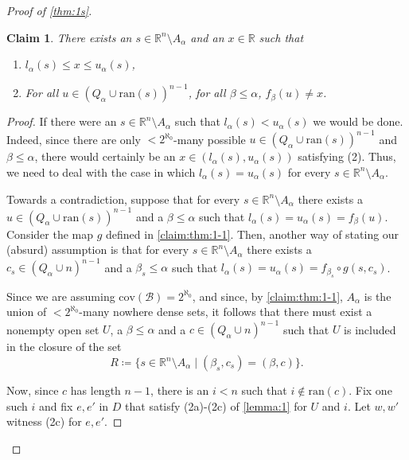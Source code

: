 \documentclass[12pt]{amsart}
\newtheorem{claim}{Claim}[theorem]
\theoremstyle{definition}
\theoremstyle{remark}
\begin{document}
\begin{proof}[Proof of \cref{thm:1s}]
\begin{claim}\label{claim:thm:1}
There exists an $s \in \mathbb{R}^n \setminus A_\alpha$ and an $x \in \mathbb{R}$ such that
\begin{enumerate}[label={\upshape (\arabic*)}]
\itemsep0.3em
\item $l_\alpha(s) \le x \le u_\alpha(s)$,
\item For all $u \in (Q_\alpha \cup \mathrm{ran}(s))^{n-1}$, for all $\beta \le \alpha$, $f_\beta(u) \neq x$.
\end{enumerate}
\end{claim}
\begin{proof}
If there were an $s \in \mathbb{R}^n \setminus A_\alpha$ such that $l_\alpha(s) < u_\alpha(s)$ we would be done. Indeed, since there are only ${<}2^{\aleph_0}$-many possible $u \in (Q_\alpha \cup \mathrm{ran}(s))^{n-1}$ and $\beta \le \alpha$, there would certainly be an $x \in (l_\alpha(s), u_\alpha(s))$ satisfying (2). Thus, we need to deal with the case in which $l_\alpha(s) = u_\alpha(s)$ for every $s \in \mathbb{R}^n \setminus A_\alpha$.

Towards a contradiction, suppose that for every $s \in \mathbb{R}^n\setminus A_\alpha$ there exists a $u \in (Q_\alpha \cup \mathrm{ran}(s))^{n-1}$ and a $\beta \le \alpha$ such that $l_\alpha(s) = u_\alpha(s) = f_\beta(u)$. Consider the map $g$ defined in \cref{claim:thm:1-1}.
Then, another way of stating our (absurd) assumption is that for every  $s \in \mathbb{R}^n \setminus A_\alpha$ there exists a $c_s \in  (Q_\alpha \cup n)^{n-1}$ and a $\beta_s \le \alpha$ such that $l_\alpha(s) = u_\alpha(s) = f_{\beta_s} \circ g (s, c_s)$.

Since we are assuming $\mathrm{cov}(\mathcal{B}) = 2^{\aleph_0}$, and since, by \cref{claim:thm:1-1}, $A_\alpha$ is the union of ${<}2^{\aleph_0}$-many nowhere dense sets, it follows that there must exist a nonempty open set $U$, a $\beta \le \alpha$ and a $c \in (Q_\alpha \cup n)^{n-1}$ such that $U$ is included in the closure of the set 
\[
R \coloneqq \{s \in \mathbb{R}^n \setminus A_\alpha \mid (\beta_s, c_s) = (\beta, c)\}.
\]

Now, since $c$ has length $n-1$, there is an $i < n$ such that $i\not\in \mathrm{ran}(c)$. Fix one such $i$ and fix $e,e'$ in $D$ that satisfy (2a)-(2c) of \cref{lemma:1} for $U$ and $i$. Let $w,w'$ witness (2c) for $e, e'$.


\end{proof}
\end{proof}
\end{document}
